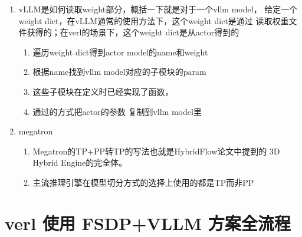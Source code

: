 \documentclass[UTF8,fontset=fandol]{ctexart}
\begin{document}
\begin{enumerate}
  \item vLLM是如何读取weight部分，概括一下就是对于一个vllm model，
    给定一个weight dict，在vLLM通常的使用方法下，这个weight dict是通过
    读取权重文件获得的；在verl的场景下，这个weight dict是从actor得到的
  \begin{enumerate}
    \item 遍历weight dict得到actor model的name和weight
    \item 根据name找到vllm model对应的子模块的param
    \item 这些子模块在定义时已经实现了函数，
    \item 通过的方式把actor的参数
      复制到vllm model里
  \end{enumerate}
  \item megatron
  \begin{enumerate}
    \item Megatron的TP+PP转TP的写法也就是HybridFlow论文中提到的
      3D Hybrid Engine的完全体。
    \item 主流推理引擎在模型切分方式的选择上使用的都是TP而非PP
  \end{enumerate}
\end{enumerate}

\section{verl 使用 FSDP+VLLM 方案全流程}
\label{sec:pipeline}
\end{document}
